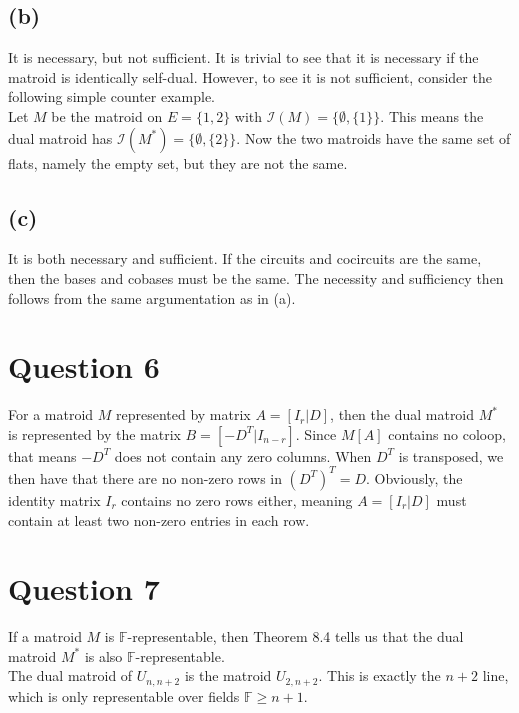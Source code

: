 \documentclass[a4paper, fleqn]{article}
\begin{document}
\subsection*{(b)}
It is necessary, but not sufficient. It is trivial to see that it is necessary if the
matroid is identically self-dual. However, to see it is not sufficient, consider the
following simple counter example.\\
Let $M$ be the matroid on $E=\{1,2\}$ with $\mathcal{I}(M)=\{\emptyset,\{1\}\}$. This
means the dual matroid has $\mathcal{I}(M^*)=\{\emptyset,\{2\}\}$. Now the two matroids
have the same set of flats, namely the empty set, but they are not the same.

\subsection*{(c)}
It is both necessary and sufficient. If the circuits and cocircuits are the same, then
the bases and cobases must be the same. The necessity and sufficiency then follows from the
same argumentation as in (a).

\section*{Question 6}
For a matroid $M$ represented by matrix $A=[I_r|D]$, then the dual matroid $M^*$ is
represented by the matrix $B=[-D^T|I_{n-r}]$. Since $M[A]$ contains no coloop, that means
$-D^T$ does not contain any zero columns. When $D^T$ is transposed, we then have that
there are no non-zero rows in $(D^T)^T=D$. Obviously, the identity matrix $I_r$ contains
no zero rows either, meaning $A=[I_r|D]$ must contain at least two non-zero entries in
each row.

\section*{Question 7}
If a matroid $M$ is $\mathbb{F}$-representable, then Theorem 8.4 tells us that the dual
matroid $M^*$ is also $\mathbb{F}$-representable. \\
The dual matroid of $U_{n,n+2}$ is the
matroid $U_{2,n+2}$. This is exactly the $n+2$ line, which is only representable over
fields $\mathbb{F}\geq n+1$.
\end{document}
